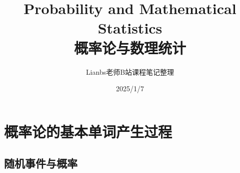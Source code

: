 \documentclass[lang=cn,newtx,10pt,scheme=chinese]{elegantbook}
\title{Probability and Mathematical Statistics\\概率论与数理统计}
\subtitle{Lianbs老师B站课程笔记整理}
\date{2025/1/7}
\begin{document}
\maketitle
\frontmatter

\tableofcontents

\mainmatter
\chapter{概率论的基本单词产生过程}
\section{随机事件与概率}
\end{document}
